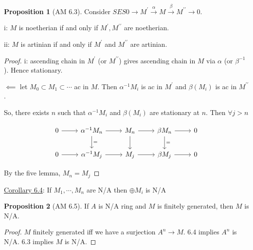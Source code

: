 \documentclass{article}
\theoremstyle{definition}
\newtheorem{proposition}{Proposition}
\begin{document}
\begin{proposition}
    [AM 6.3]

    Consider \(SES 0 \longrightarrow M^{\prime} \overset{\alpha}{\longrightarrow} M \overset{\beta}{\longrightarrow} M^{\prime\prime} \longrightarrow 0\).
    
    i: \(M\) is noetherian if and only if \(M^{\prime} , M^{\prime\prime} \) are noetherian.
    
    ii: \(M\) is artinian if and only if \(M^{\prime}\) and \(M^{\prime\prime}\) are artinian.  
\end{proposition}

\begin{proof}
    i: ascending chain in \(M^{\prime}\) (or \(M^{\prime\prime}\)) gives ascending chain in \(M\) via \(\alpha\) (or \(\beta ^{-1}\)). Hence stationary.
    
    \(\impliedby\) let \(M_0 \subset M_1 \subset \cdots\) ac in \(M\). Then \(\alpha ^{-1} M_i\) is ac in \(M^{\prime} \) and \(\beta(M_i)\) is ac in \(M^{\prime\prime}\).
    
    So, there exists \(n\) such that \(\alpha ^{-1} M_i\) and \(\beta(M_i)\) are stationary at \(n\). Then \(\forall j > n\)
    
    \[
        \begin{tikzcd}
            0 \ar[r] & \alpha ^{-1} M_n \ar[d,"="] \ar[r] & M_n \ar[r] \ar[d] & \beta M_n \ar[d,"="] \ar[r] & 0 \\
            0 \ar[r] & \alpha ^{-1} M_j \ar[r] & M_j \ar[r] & \beta M_j \ar[r] & 0
        \end{tikzcd}
    \]

    By the five lemma, \(M_n = M_j\) 

\end{proof}

\underline{Corollary 6.4}: If \(M_1,\cdots, M_n\) are N/A then \(\oplus M_i\) is N/A 

\begin{proposition}
    [AM 6.5]

    If \(A\) is N/A ring and \(M\) is finitely generated, then \(M\) is N/A.
\end{proposition}

\begin{proof}
    \(M\) finitely generated iff we have a surjection \(A^n \rightarrow M\). 6.4 implies \(A^n\) is N/A. 6.3 implies \(M\) is N/A. 
\end{proof}

\hrulefill
\end{document}

